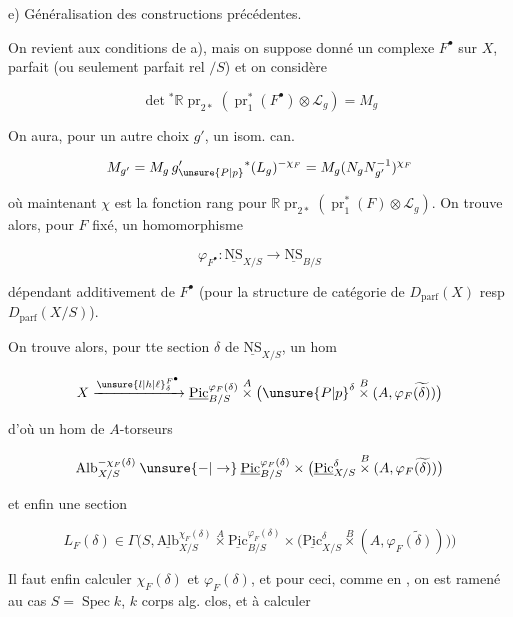 
e) Généralisation des constructions précédentes.

On revient aux conditions de a), mais on suppose donné un complexe  $F^{\bullet}$ sur $X$,  parfait (ou seulement parfait rel $/S$) et on considère

\[
\det{}^{*}\mathbb R\operatorname{pr}_{2*}(\operatorname{pr}_1^{*}(F^{\bullet})\otimes\mathscr L_g)=M_g
\]

On aura, pour un autre choix $g'$,  un isom. can.

\[
M_{g'}=M_g\,g'_{\unsure{P|p}}{}^{*}(L_g)^{-\chi_F}=M_g(N_gN_{g'}^{-1})^{\chi_F}
\]

où maintenant $\chi$ est la fonction rang pour $\mathbb R\operatorname{pr}_{2*}(\operatorname{pr}_1^{*}(F)\otimes\mathscr L_g)$. On trouve alors, pour $F$ fixé, un homomorphisme

\[
\varphi_{F^{\bullet}}\colon\underline{\mathrm{NS}}_{X/S}\longrightarrow\underline{\mathrm{NS}}_{B/S}
\]

dépendant additivement de $F^{\bullet}$ (pour la structure de catégorie  de $D_{\mathrm{parf}}(X)$ resp $D_{\mathrm{parf}}(X/S)$).

On trouve alors, pour tte section $\delta$ de $\underline{\mathrm{NS}}_{X/S}$, un hom

\[
X\xrightarrow{{\unsure{l|h|\ell}}_{\delta}^{F^{\bullet}}}\underline{\mathrm{Pic}}^{\varphi_F(\delta)}_{B/S}\overset{A}{\times}\bigl({\unsure{P|p}}^{\delta}\overset{B}{\times}(A,\varphi_F\widetilde{(\delta)})\bigr)
\]

d'où un hom de $A$-torseurs

\[
\mathrm{Alb}^{-\chi_F(\delta)}_{X/S}\mathbin{\unsure{-|\to}}\underline{\mathrm{Pic}}^{\varphi_F(\delta)}_{B/S}\times\bigl(\underline{\mathrm{Pic}}^{\delta}_{X/S}\overset{B}{\times}(A,\varphi_F\widetilde{(\delta)})\bigr)
\]

et enfin une section

\[
\boxed{L_F(\delta)\in\Gamma\bigl(S,\underline{\mathrm{Alb}}_{X/S}^{\chi_F(\delta)}\overset{A}{\times}\underline{\mathrm{Pic}}_{B/S}^{\varphi_F(\delta)}\times\bigl(\underline{\mathrm{Pic}}_{X/S}^{\delta}\overset{B}{\times}(A,\varphi_F\widetilde{(\delta)})\bigr)\bigr)}
\]

Il faut enfin calculer $\chi_F(\delta)$ et $\varphi_F(\delta)$, et pour ceci, comme en , on est ramené au cas $S=\operatorname{Spec} k$, $k$ corps alg. clos, et à calculer

